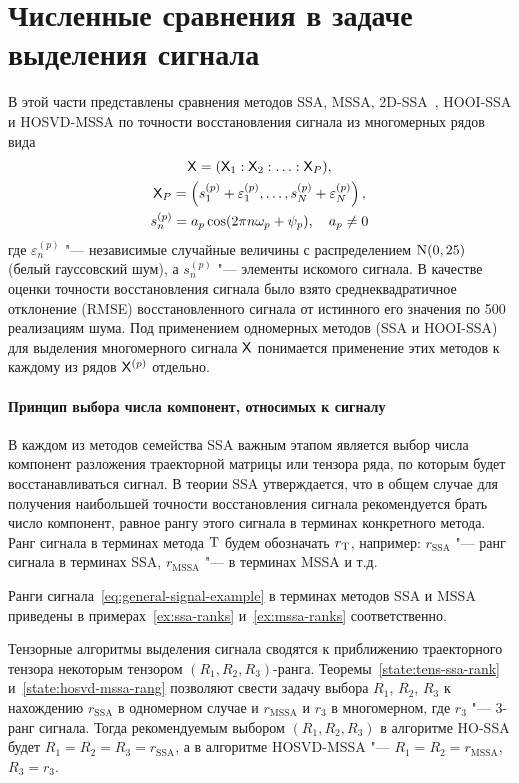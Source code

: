 \documentclass[specialist,
  substylefile=spbu.rtx,
subf,href,colorlinks=true, 12pt]{disser}
\theoremstyle{plain}
\theoremstyle{definition}
\theoremstyle{remark}
\begin{document}
\section{Численные сравнения в задаче выделения сигнала}\label{sec:numerical-compar}
В этой части представлены сравнения методов SSA, MSSA, 2D-SSA~\cite{2d-ssa}, HOOI-SSA и HOSVD-MSSA
по точности восстановления сигнала из многомерных рядов вида
\begin{gather}
  \mathsf{X} = (\mathsf{X}_1: \mathsf{X}_2 : \ldots: \mathsf{X}_P), \nonumber \\
  \mathsf{X}_P = \left(s_1^{(p)} + \varepsilon_1^{(p)}, \ldots, s_N^{(p)} + \varepsilon_N^{(p)}\right),\nonumber \\
  s_n^{(p)} = a_p \cos(2\pi n \omega_p + \psi_p), \quad a_p \ne 0 \label{eq:general-signal-example}
\end{gather}
где $\varepsilon_n^{(p)}$ "--- независимые случайные величины с распределением $\mathrm{N}(0, 25)$
(белый гауссовский шум), а $s_n^{(p)}$ "--- элементы искомого сигнала.
В качестве оценки точности восстановления сигнала было взято среднеквадратичное отклонение (RMSE)
восстановленного сигнала от истинного его значения по 500 реализациям шума.
Под применением одномерных методов (SSA и HOOI-SSA) для выделения многомерного сигнала $\mathsf{X}$ понимается
применение этих методов к каждому из рядов $\mathsf{X}^{(p)}$ отдельно.

\paragraph{Принцип выбора числа компонент, относимых к сигналу}\label{subsec:example-signal-ranks}
В каждом из методов семейства SSA важным этапом является выбор числа компонент разложения траекторной матрицы
или тензора ряда, по которым будет восстанавливаться сигнал.
В теории SSA утверждается, что в общем случае для получения наибольшей точности восстановления
сигнала рекомендуется брать число компонент, равное рангу этого сигнала в терминах конкретного метода.
Ранг сигнала в терминах метода $\mathrm{T}$ будем обозначать $r_{\mathrm{T}}$, например: $r_\text{SSA}$ "---
ранг сигнала в терминах SSA, $r_\text{MSSA}$ "--- в терминах MSSA и т.д.

Ранги сигнала~\eqref{eq:general-signal-example} в терминах методов SSA и MSSA приведены в
примерах~\ref{ex:ssa-ranks} и~\ref{ex:mssa-ranks} соответственно.

Тензорные алгоритмы выделения сигнала сводятся к приближению траекторного тензора некоторым
тензором $(R_1, R_2, R_3)$-ранга.
Теоремы~\ref{state:tens-ssa-rank} и~\ref{state:hosvd-mssa-rang} позволяют свести задачу выбора $R_1$,
$R_2$, $R_3$ к нахождению $r_{\text{SSA}}$ в одномерном случае и $r_\text{MSSA}$ и $r_3$ в многомерном,
где $r_3$ "--- 3-ранг сигнала.
Тогда рекомендуемым выбором $(R_1, R_2, R_3)$ в алгоритме HO-SSA будет $R_1=R_2=R_3=r_\text{SSA}$, а
в алгоритме HOSVD-MSSA "--- $R_1=R_2=r_\text{MSSA}$, $R_3 = r_3$.
\end{document}
